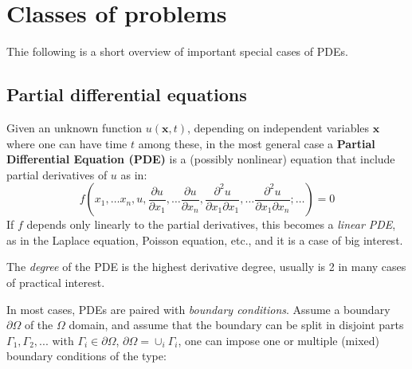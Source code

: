 \documentclass{digitaldynamics}
\def\vect#1{\bm{#1}}
\begin{document}
\newpage
\section{Classes of problems}

Thie following is a short overview of important special cases of PDEs. 


\subsection{Partial differential equations}

Given an unknown function $u(\vect{x},t)$, depending on independent variables $\vect{x}$ where one can have time $t$ among these, in the most 
general case a \textbf{Partial Differential Equation (PDE)} is a (possibly nonlinear)
equation that include partial derivatives of $u$ as in:
\[
f \left (x_1, \ldots x_n, u, \frac{\partial u}{\partial x_1}, \ldots \frac{\partial u}{\partial x_n}, \frac{\partial^2 u}{\partial x_1 \partial x_1}, \ldots \frac{\partial^2 u}{\partial x_1 \partial x_n}; \ldots \right) = 0 
\]
If $f$ depends only linearly to the partial derivatives, this becomes a \textit{linear PDE}, as in the Laplace equation, Poisson equation, etc., and it is a case of big interest. 

The \textit{degree} of the PDE is the highest derivative degree, usually is 2 in many cases of practical interest.

In most cases, PDEs are paired with \textit{boundary conditions}. Assume a boundary $\partial \Omega$ of the $\Omega$ domain, and assume that the boundary can be split in disjoint parts $\Gamma_1, \Gamma_2, ...$ with $\Gamma_i \in \partial\Omega$, $\partial\Omega = \cup_i \Gamma_i$, one can impose one or multiple (mixed) boundary conditions of the type:
\end{document}
